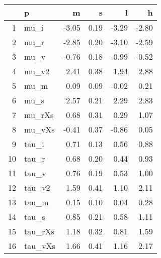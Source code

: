 \begin{table}[ht]
\centering
\begin{tabular}{rlrrrr}
  \hline
 & p & m & s & l & h \\ 
  \hline
1 & mu\_i & -3.05 & 0.19 & -3.29 & -2.80 \\ 
  2 & mu\_r & -2.85 & 0.20 & -3.10 & -2.59 \\ 
  3 & mu\_v & -0.76 & 0.18 & -0.99 & -0.52 \\ 
  4 & mu\_v2 & 2.41 & 0.38 & 1.94 & 2.88 \\ 
  5 & mu\_m & 0.09 & 0.09 & -0.02 & 0.21 \\ 
  6 & mu\_s & 2.57 & 0.21 & 2.29 & 2.83 \\ 
  7 & mu\_rXs & 0.68 & 0.31 & 0.29 & 1.07 \\ 
  8 & mu\_vXs & -0.41 & 0.37 & -0.86 & 0.05 \\ 
  9 & tau\_i & 0.71 & 0.13 & 0.56 & 0.88 \\ 
  10 & tau\_r & 0.68 & 0.20 & 0.44 & 0.93 \\ 
  11 & tau\_v & 0.76 & 0.19 & 0.53 & 1.00 \\ 
  12 & tau\_v2 & 1.59 & 0.41 & 1.10 & 2.11 \\ 
  13 & tau\_m & 0.15 & 0.10 & 0.04 & 0.28 \\ 
  14 & tau\_s & 0.85 & 0.21 & 0.58 & 1.11 \\ 
  15 & tau\_rXs & 1.18 & 0.32 & 0.81 & 1.59 \\ 
  16 & tau\_vXs & 1.66 & 0.41 & 1.16 & 2.17 \\ 
   \hline
\end{tabular}
\label{tab:param}
\end{table}
